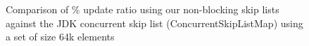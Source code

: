 \begin{figure}
\begin{center}
	\end{center}
	\caption{Comparison of \% update ratio using our non-blocking skip lists against the JDK concurrent skip list (ConcurrentSkipListMap) using a set of size 64k elements}
\end{figure}


